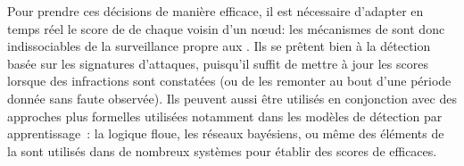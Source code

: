 Pour prendre ces décisions de manière efficace, il est nécessaire d'adapter en temps réel le score de \reput de chaque voisin d'un nœud: les mécanismes de  sont donc indissociables de la surveillance propre aux \IDS.
Ils se prêtent bien à la détection basée sur les signatures d'attaques, puisqu'il suffit de mettre à jour les scores lorsque des infractions sont constatées (ou de les remonter au bout d'une période donnée sans faute observée).
Ils peuvent aussi être utilisés en conjonction avec des approches plus formelles utilisées notamment dans les modèles de détection par apprentissage~\cite{F-GRL07,MC10}: la logique floue, les réseaux bayésiens, ou même des éléments de la  sont utilisés dans de nombreux systèmes pour établir des scores de  efficaces.
